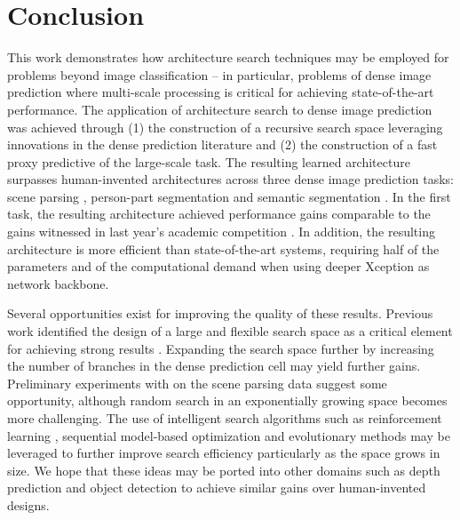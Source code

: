 \documentclass{article}
\begin{document}
 \section{Conclusion}
\label{sec:conclusion}

This work demonstrates how architecture search techniques may be employed for problems beyond image classification -- in particular, problems of dense image prediction where multi-scale processing is critical for achieving state-of-the-art performance. The application of architecture search to dense image prediction was achieved through (1) the construction of a recursive search space leveraging innovations in the dense prediction literature and (2) the construction of a fast proxy predictive of the large-scale task. The resulting learned architecture surpasses human-invented architectures across three dense image prediction tasks: scene parsing \cite{Cordts2016Cityscapes}, person-part segmentation \cite{chen_cvpr14} and semantic segmentation \cite{everingham2014pascal}. In the first task, the resulting architecture achieved performance gains comparable to the gains witnessed in last year's academic competition \cite{Cordts2016Cityscapes}. In addition, the resulting architecture is more efficient than state-of-the-art systems, requiring half of the parameters and  of the computational demand when using deeper Xception \cite{chollet2016xception, dai2017coco, deeplabv3plus2018} as network backbone.


Several opportunities exist for improving the quality of these results. Previous work identified the design of a large and flexible search space as a critical element for achieving strong results  \cite{zoph2017learning,liu2018progressive,zoph2017neural,pham2018efficient}.
Expanding the search space further by increasing the number of branches  in the dense prediction cell may yield further gains. Preliminary experiments with  on the scene parsing data suggest some opportunity, although random search in an exponentially growing space becomes more challenging. The use of intelligent search algorithms such as reinforcement learning \cite{baker2017designing, zhong2018practical}, sequential model-based optimization \cite{negrinho2017deeparchitect, liu2018progressive}  and evolutionary methods \cite{stanley2002evolving, real2017large,miikkulainen2017evolving, xie2017genetic, liu2018hierarchical, real2018regularized} may be leveraged to further improve search efficiency particularly as the space grows in size. 
We hope that these ideas may be ported into other domains such as depth prediction \cite{silberman2012indoor} and object detection \cite{redmon2016you,liu2015ssd} to achieve similar gains over human-invented designs.
\end{document}
